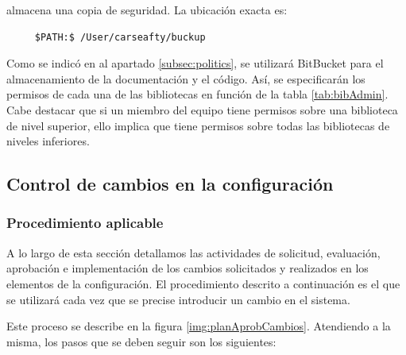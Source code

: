 \begin{description}[style=multiline, leftmargin=4cm]
  \item[\textbf{Backup:}] almacena una copia de seguridad. La ubicación exacta es:
  \begin{lstlisting}
     $PATH:$ /User/carseafty/buckup
  \end{lstlisting}

\end{description}

\par Como se indicó en al apartado \ref{subsec:politics}, se utilizará BitBucket para el almacenamiento de la documentación y el código. Así, se especificarán los permisos de cada una de las bibliotecas en función de la tabla \ref{tab:bibAdmin}. Cabe destacar que si un miembro del equipo tiene permisos sobre una biblioteca de nivel superior, ello implica que tiene permisos sobre todas las bibliotecas de niveles inferiores.




\subsection{Control de cambios en la configuración}
\subsubsection{Procedimiento aplicable}
\par A lo largo de esta sección detallamos las actividades de solicitud, evaluación, aprobación e implementación de los cambios solicitados y realizados en los elementos de la configuración. El procedimiento descrito a continuación es el que se utilizará cada vez que se precise introducir un cambio en el sistema.
\par Este proceso se describe en la figura \ref{img:planAprobCambios}. Atendiendo a la misma, los pasos que se deben seguir son los siguientes:

